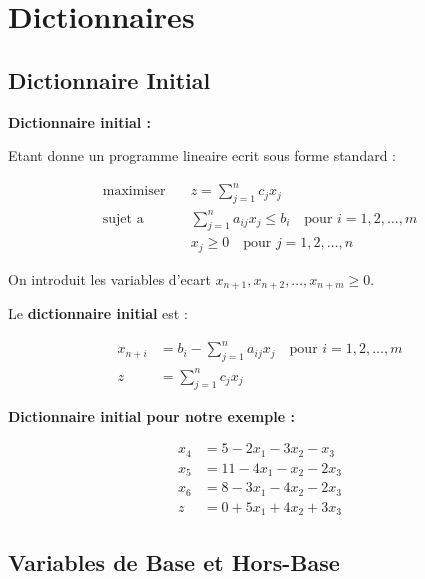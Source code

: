 \documentclass[12pt,a4paper]{article}
\begin{document}
\newpage
\section{Dictionnaires}

\subsection{Dictionnaire Initial}

\begin{definition}
\textbf{Dictionnaire initial :}

Etant donne un programme lineaire ecrit sous forme standard :

\begin{align*}
\text{maximiser} \quad & z = \sum_{j=1}^{n} c_jx_j\\
\text{sujet a} \quad & \sum_{j=1}^{n} a_{ij}x_j \leq b_i \quad \text{pour } i = 1, 2, \ldots, m\\
& x_j \geq 0 \quad \text{pour } j = 1, 2, \ldots, n
\end{align*}

On introduit les variables d'ecart $x_{n+1}, x_{n+2}, \ldots, x_{n+m} \geq 0$.

Le \textcolor{defvert}{\textbf{dictionnaire initial}} est :

\begin{align*}
x_{n+i} &= b_i - \sum_{j=1}^{n} a_{ij}x_j \quad \text{pour } i = 1, 2, \ldots, m\\
z &= \sum_{j=1}^{n} c_jx_j
\end{align*}
\end{definition}

\begin{exemple}
\textbf{Dictionnaire initial pour notre exemple :}

\begin{align*}
x_4 &= 5 - 2x_1 - 3x_2 - x_3\\
x_5 &= 11 - 4x_1 - x_2 - 2x_3\\
x_6 &= 8 - 3x_1 - 4x_2 - 2x_3\\
z &= 0 + 5x_1 + 4x_2 + 3x_3
\end{align*}
\end{exemple}

\newpage
\subsection{Variables de Base et Hors-Base}
\end{document}
